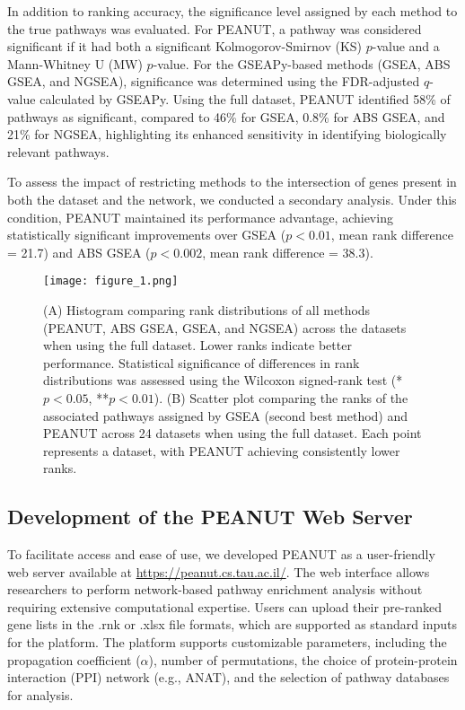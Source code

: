 \documentclass{article}
\begin{document}
In addition to ranking accuracy, the significance level assigned by each method to the true pathways was evaluated. For PEANUT, a pathway was considered significant if it had both a significant Kolmogorov-Smirnov (KS) $p$-value and a Mann-Whitney U (MW) $p$-value. For the GSEAPy-based methods (GSEA, ABS GSEA, and NGSEA), significance was determined using the FDR-adjusted $q$-value calculated by GSEAPy. Using the full dataset, PEANUT identified 58\% of pathways as significant, compared to 46\% for GSEA, 0.8\% for ABS GSEA, and 21\% for NGSEA, highlighting its enhanced sensitivity in identifying biologically relevant pathways.

To assess the impact of restricting methods to the intersection of genes present in both the dataset and the network, we conducted a secondary analysis. Under this condition, PEANUT maintained its performance advantage, achieving statistically significant improvements over GSEA ($p<0.01$, mean rank difference = 21.7) and ABS GSEA ($p<0.002$, mean rank difference = 38.3).

\begin{figure}[ht]
    \centering
    \texttt{[image: figure\_1.png]}
    \caption{(A) Histogram comparing rank distributions of all methods (PEANUT, ABS GSEA, GSEA, and NGSEA) across the datasets when using the full dataset. Lower ranks indicate better performance. Statistical significance of differences in rank distributions was assessed using the Wilcoxon signed-rank test (*$p < 0.05$, **$p < 0.01$). (B) Scatter plot comparing the ranks of the associated pathways assigned by GSEA (second best method) and PEANUT across 24 datasets when using the full dataset. Each point represents a dataset, with PEANUT achieving consistently lower ranks.}
    \label{fig:rank_comparison_alpha_0.2}
\end{figure}

\subsection{Development of the PEANUT Web Server}
To facilitate access and ease of use, we developed PEANUT as a user-friendly web server available at \url{https://peanut.cs.tau.ac.il/}. The web interface allows researchers to perform network-based pathway enrichment analysis without requiring extensive computational expertise. Users can upload their pre-ranked gene lists in the .rnk or .xlsx file formats, which are supported as standard inputs for the platform. The platform supports customizable parameters, including the propagation coefficient ($\alpha$), number of permutations, the choice of protein-protein interaction (PPI) network (e.g., ANAT), and the selection of pathway databases for analysis.
\end{document}
